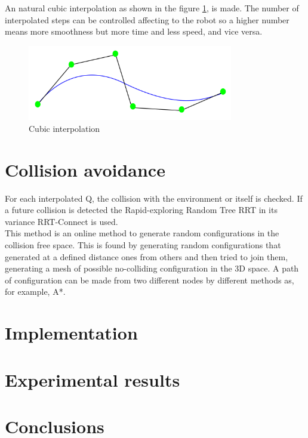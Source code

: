 An natural cubic interpolation as shown in the figure \ref{fig:cubic interpolation}, is made. The number of interpolated steps can be controlled affecting to the robot so a higher number means more smoothness but more time and less speed, and vice versa.

\begin{figure}[!hb]
	\centering
	\includegraphics[width=0.8\textwidth]{figures/cubic_interpolation}
	\caption{Cubic interpolation}
	\label{fig:cubic interpolation}
\end{figure}

\section{Collision avoidance} %
\label{sec:collision_avoidance}
For each interpolated Q, the collision with the environment or itself is checked. If a future collision is detected the Rapid-exploring Random Tree RRT in its variance RRT-Connect \cite{RRTConnect} is used.\\

This method is an online method to generate random configurations in the collision free space. This is found by generating random configurations that generated at a defined distance ones from others and then tried to join them, generating a mesh of possible no-colliding configuration in the 3D space. A path of configuration can be made from two different nodes by different methods as, for example, A*.

\section{Implementation} %
\label{sec:implementation}


\section{Experimental results} %
\label{sec:experimental_results}


\section{Conclusions} %
\label{sec:conclusions}


